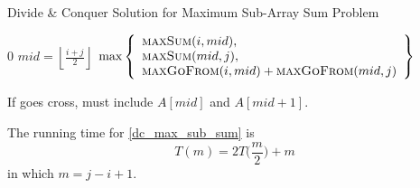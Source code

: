 \begin{algorithm}[H]
    \caption{Divide \& Conquer Solution for Maximum Sub-Array Sum Problem}\label{dc_max_sub_sum}
\begin{algorithmic}[1]
    \Return $0$
  \EndIf
  \State $mid = \left\lfloor \frac{i + j}{2} \right\rfloor$
  \Return $\max\left\{
      \begin{array}{l}
          \textsc{maxSum} (i, mid), \\
          \textsc{maxSum} (mid, j), \\
          \textsc{maxGoFrom} (i, mid) + \textsc{maxGoFrom} (mid, j)
      \end{array}
  \right\}$
\EndProcedure
\end{algorithmic}
\end{algorithm}

If goes cross, must include $A[mid]$ and $A[mid+1]$.

The running time for \cref{dc_max_sub_sum} is
\[T(m) = 2T\bigg(\frac{m}{2}\bigg) + m\]
in which $m = j - i + 1$.


